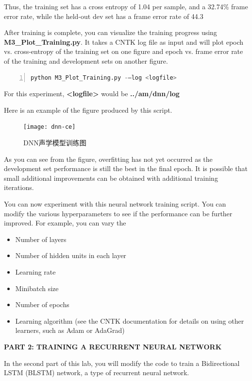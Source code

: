Thus, the training set has a cross entropy of 1.04 per sample, and a 32.74\% frame error rate, while the held-out dev set has a frame error rate of 44.3%

After training is complete, you can visualize the training progress using {\bf M3\_Plot\_Training.py}. It takes a CNTK log file as input and will plot epoch vs. cross-entropy of the training set on one figure and epoch vs. frame error rate of the training and development sets on another figure.
\begin{lstlisting}[language = python, numbers=left, 
				 numberstyle=\tiny,keywordstyle=\color{blue!70},
				 commentstyle=\color{red!50!green!50!blue!50},frame=shadowbox,
				 rulesepcolor=\color{red!20!green!20!blue!20},basicstyle=\ttfamily]
python M3_Plot_Training.py -–log <logfile>
\end{lstlisting}

For this experiment, {\bf <logfile>} would be {\bf ../am/dnn/log}

Here is an example of the figure produced by this script.
\begin{figure}[htbp]
	\centering
	\texttt{[image: dnn-ce]}
	\caption{DNN声学模型训练图\label{fig:dnn-ce}}
\end{figure}

As you can see from the figure, overfitting has not yet occurred as the development set performance is still the best in the final epoch. It is possible that small additional improvements can be obtained with additional training iterations.

You can now experiment with this neural network training script. You can modify the various hyperparameters to see if the performance can be further improved. For example, you can vary the
\begin{itemize}
	\item Number of layers
	\item Number of hidden units in each layer
	\item Learning rate
	\item Minibatch size
	\item Number of epochs
	\item Learning algorithm (see the CNTK documentation for details on using other learners, such as Adam or AdaGrad)
\end{itemize}

{\bf PART 2: TRAINING A RECURRENT NEURAL NETWORK}

In the second part of this lab, you will modify the code to train a Bidirectional LSTM (BLSTM) network, a type of recurrent neural network.

